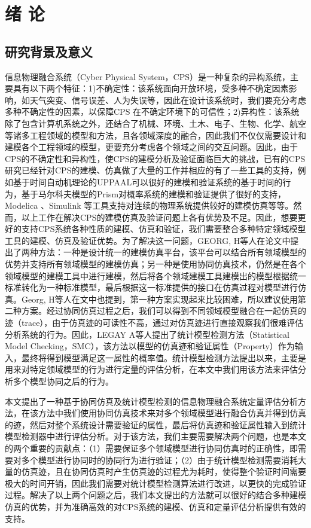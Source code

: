 \chapter{绪\hskip 0.4cm 论}
\label{ch1}

\section{研究背景及意义}
信息物理融合系统（Cyber Physical System，CPS）\cite{wangzhongjie2011cpssurvey}是一种复杂的异构系统，主要具有以下两个特征：1)不确定性：该系统面向开放环境，受多种不确定因素影响，如天气突变、信号误差、人为失误等，因此在设计该系统时，我们要充分考虑多种不确定性的因素，以保障CPS 在不确定环境下的可信性；2)异构性：该系统除了包含计算机系统之外，还结合了机械、环境、土木、电子、生物、化学、航空等诸多工程领域的模型和方法，且各领域深度的融合，因此我们不仅仅需要设计和建模各个工程领域的模型，更要充分考虑各个领域之间的交互问题。因此，由于CPS的不确定性和异构性，使CPS的建模分析及验证面临巨大的挑战，已有的CPS研究已经针对CPS的建模、仿真做了大量的工作并相应的有了一些工具的支持，例如基于时间自动机理论的UPPAAL\cite{bulychev2012uppaal}可以很好的建模和验证系统的基于时间的行为，基于马尔科夫模型的Prism\cite{kwiatkowska2011prism}对概率系统的建模和验证提供了很好的支持，Modelica \cite{Fritzson1998Modelica}、Simulink\cite{zuliani2013bayesian} 等工具支持对连续的物理系统提供较好的建模仿真等等。然而，以上工作在解决CPS的建模仿真及验证问题上各有优势及不足。因此，想要更好的支持CPS系统各种性质的建模、仿真和验证，我们需要整合多种特定领域模型工具的建模、仿真及验证优势。为了解决这一问题，GEORG, H等人在论文\cite{Georg2014Analyzing}中提出了两种方法：一种是设计统一的建模仿真平台，该平台可以结合所有领域模型的优势并支持所有领域模型的建模仿真；另一种是使用协同仿真技术，仍然是在各个领域模型的建模工具中进行建模，然后将各个领域建模工具建模出的模型根据统一标准转化为一种标准模型，最后根据这一标准提供的接口在仿真过程对模型进行仿真。Georg, H等人在文中也提到，第一种方案实现起来比较困难，所以建议使用第二种方案。经过协同仿真过程之后，我们可以得到不同领域模型融合在一起仿真的迹（trace），由于仿真迹的可读性不高，通过对仿真迹进行直接观察我们很难评估分析系统的行为。因此，LEGAY A等人提出了统计模型检测方法（Statistical Model Checking，SMC）\cite{Legay2010Statistical}，该方法以模型的仿真迹和验证属性（Property）作为输入，最终将得到模型满足这一属性的概率值。统计模型检测方法提出以来，主要是用来对特定领域模型的行为进行定量的评估分析，在本文中我们用该方法来评估分析多个模型协同之后的行为。

本文提出了一种基于协同仿真及统计模型检测的信息物理融合系统定量评估分析方法，在该方法中我们使用协同仿真技术来对多个领域模型进行融合仿真并得到仿真的迹，然后对整个系统设计需要验证的属性，最后将仿真迹和验证属性输入到统计模型检测器中进行评估分析。对于该方法，我们主要需要解决两个问题，也是本文的两个重要的贡献点：（1）需要保证多个领域模型进行协同仿真时的正确性，即需要对多个模型进行协同时的协同行为进行验证；（2）由于统计模型检测需要消耗大量的仿真迹，且在协同仿真时产生仿真迹的过程尤为耗时，使得整个验证时间需要极大的时间开销，因此我们需要对统计模型检测算法进行改进，以更快的完成验证过程。解决了以上两个问题之后，我们本文提出的方法就可以很好的结合多种建模仿真的优势，并为准确高效的对CPS系统的建模、仿真和定量评估分析提供有效的支持。 


